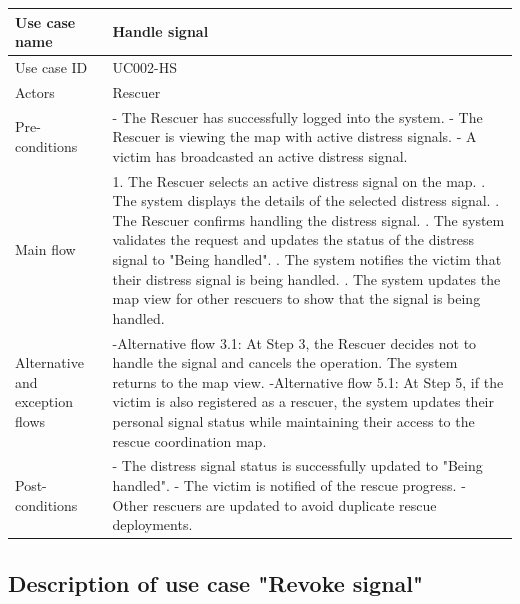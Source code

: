 \documentclass[../Main.tex]{subfiles}
\begin{document}
\begin{xltabular}{\textwidth}{|p{3.5cm}|X|}
    Use case name & Handle signal \\
    \hline
    Use case ID & UC002-HS \\
    \hline
    Actors & Rescuer \\
    \hline
    Pre-conditions &
    - The Rescuer has successfully logged into the system. \newline
    - The Rescuer is viewing the map with active distress signals. \newline
    - A victim has broadcasted an active distress signal. \\
    \hline
    Main flow &
    1. The Rescuer selects an active distress signal on the map. . The system displays the details of the selected distress signal. . The Rescuer confirms handling the distress signal. . The system validates the request and updates the status of the distress signal to "Being handled". . The system notifies the victim that their distress signal is being handled. . The system updates the map view for other rescuers to show that the signal is being handled. \\
    \hline
    Alternative and exception flows &
    -Alternative flow 3.1: At Step 3, the Rescuer decides not to handle the signal and cancels the operation. The system returns to the map view. \newline
    -Alternative flow 5.1: At Step 5, if the victim is also registered as a rescuer, the system updates their personal signal status while maintaining their access to the rescue coordination map. \\
    \hline
    Post-conditions &
    - The distress signal status is successfully updated to "Being handled". \newline
    - The victim is notified of the rescue progress. \newline
    - Other rescuers are updated to avoid duplicate rescue deployments. \\
    \hline
\end{xltabular}

\subsection{Description of use case "Revoke signal"}
\label{section:2.3.3}
\end{document}
